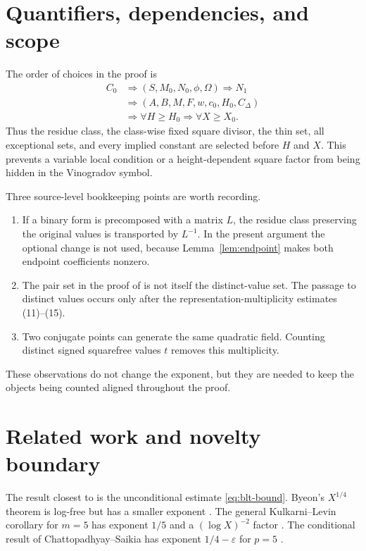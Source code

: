 \documentclass[11pt,reqno]{amsart}
\theoremstyle{definition}
\theoremstyle{remark}
\begin{document}
\section{Quantifiers, dependencies, and scope}\label{sec:scope}

The order of choices in the proof is
\begin{equation}\label{eq:quantifier-order}
\begin{aligned}
  C_0
  &\Longrightarrow(S,M_0,N_0,\phi,\Omega)
  \Longrightarrow N_1\\
  &\Longrightarrow(A,B,M,F,w,c_0,H_0,C_\Delta)\\
  &\Longrightarrow \forall H\geq H_0
  \Longrightarrow \forall X\geq X_0.
\end{aligned}
\end{equation}
Thus the residue class, the class-wise fixed square divisor, the thin set, all
exceptional sets, and every implied constant are selected before \(H\) and
\(X\).  This prevents a variable local condition or a height-dependent square
factor from being hidden in the Vinogradov symbol.

Three source-level bookkeeping points are worth recording.
\begin{enumerate}[label=(\roman*)]
  \item If a binary form is precomposed with a matrix \(L\), the residue class
  preserving the original values is transported by \(L^{-1}\).  In the
  present argument the optional change is not used, because
  Lemma~\ref{lem:endpoint} makes both endpoint coefficients nonzero.
  \item The pair set in the proof of \cite[Theorem~1]{StewartTop1995} is not
  itself the distinct-value set.  The passage to distinct values occurs only
  after the representation-multiplicity estimates (11)--(15).
  \item Two conjugate points can generate the same quadratic field.  Counting
  distinct signed squarefree values \(t\) removes this multiplicity.
\end{enumerate}
These observations do not change the exponent, but they are needed to keep the
objects being counted aligned throughout the proof.

\section{Related work and novelty boundary}\label{sec:related}

The result closest to  is the unconditional estimate
\eqref{eq:blt-bound}.  Byeon's \(X^{1/4}\) theorem is log-free but has a
smaller exponent \cite{Byeon2009}.  The general Kulkarni--Levin corollary for
\(m=5\) has exponent \(1/5\) and a \((\log X)^{-2}\) factor
\cite[Corollary~1.4]{KulkarniLevin2022}.  The conditional result of
Chattopadhyay--Saikia has exponent \(1/4-\varepsilon\) for \(p=5\)
\cite{ChattopadhyaySaikia2023}.
\end{document}
